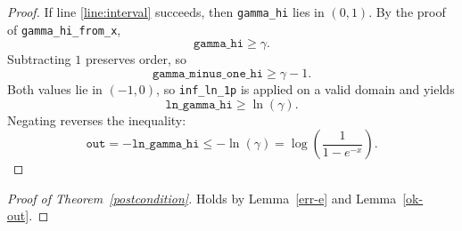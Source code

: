 \documentclass{article}
\begin{document}
\begin{proof}
If line \ref{line:interval} succeeds, then \texttt{gamma\_hi} lies in $(0,1)$.
By the proof of \texttt{gamma\_hi\_from\_x},
\[
\texttt{gamma\_hi} \ge \gamma.
\]
Subtracting $1$ preserves order, so
\[
\texttt{gamma\_minus\_one\_hi} \ge \gamma - 1.
\]
Both values lie in $(-1,0)$, so \texttt{inf\_ln\_1p} is applied on a valid domain and yields
\[
\texttt{ln\_gamma\_hi} \ge \ln(\gamma).
\]
Negating reverses the inequality:
\[
\texttt{out} = -\texttt{ln\_gamma\_hi} \le -\ln(\gamma)
= \log\!\left(\frac{1}{1 - e^{-x}}\right).
\]
\end{proof}

\begin{proof}[Proof of Theorem~\ref{postcondition}]
Holds by Lemma~\ref{err-e} and Lemma~\ref{ok-out}.
\end{proof}
\end{document}
